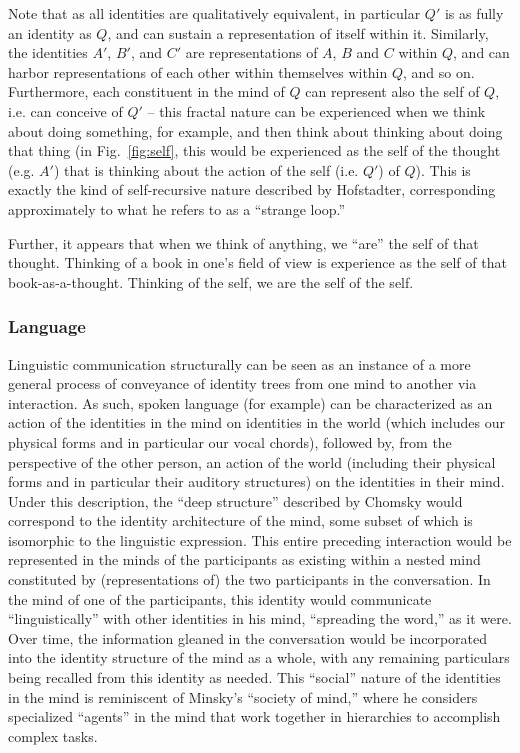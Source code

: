 \documentclass[pra,twocolumn,groupedaddress,10pt]{revtex4}
\theoremstyle{definition}
\begin{document}
Note that as all identities are qualitatively equivalent, in particular $Q'$ is as fully an identity as $Q$, and can sustain a representation of itself within it. Similarly, the identities $A'$, $B'$, and $C'$ are representations of $A$, $B$ and $C$ within $Q$, and can harbor representations of each other within themselves within $Q$, and so on. Furthermore, each constituent in the mind of $Q$ can represent also the self of $Q$, i.e. can conceive of $Q'$ -- this fractal nature can be experienced when we think about doing something, for example, and then think about thinking about doing that thing (in Fig.~\ref{fig:self}, this would be experienced as the self of the thought (e.g. $A'$) that is thinking about the action of the self (i.e. $Q'$) of $Q$). This is exactly the kind of self-recursive nature described by Hofstadter\cite{geb}, corresponding approximately to what he refers to as a ``strange loop.''

Further, it appears that when we think of anything, we ``are'' the self of that thought. Thinking of a book in one's field of view is experience as the self of that book-as-a-thought. Thinking of the self, we are the self of the self.

\subsubsection{Language} \label{sec:language}

Linguistic communication structurally can be seen as an instance of a more general process of conveyance of identity trees from one mind to another via interaction. As such, spoken language (for example) can be characterized as an action of the identities in the mind on identities in the world (which includes our physical forms and in particular our vocal chords), followed by, from the perspective of the other person, an action of the world (including their physical forms and in particular their auditory structures) on the identities in their mind. Under this description, the ``deep structure'' described by Chomsky\cite{chomsky} would correspond to the identity architecture of the mind, some subset of which is isomorphic to the linguistic expression. This entire preceding interaction would be represented in the minds of the participants as existing within a nested mind constituted by (representations of) the two participants in the conversation. In the mind of one of the participants, this identity would communicate ``linguistically'' with other identities in his mind, ``spreading the word,'' as it were. Over time, the information gleaned in the conversation would be incorporated into the identity structure of the mind as a whole, with any remaining particulars being recalled from this identity as needed. This ``social'' nature of the identities in the mind is reminiscent of Minsky's ``society of mind,''\cite{minsky} where he considers specialized ``agents'' in the mind that work together in hierarchies to accomplish complex tasks.
\end{document}
